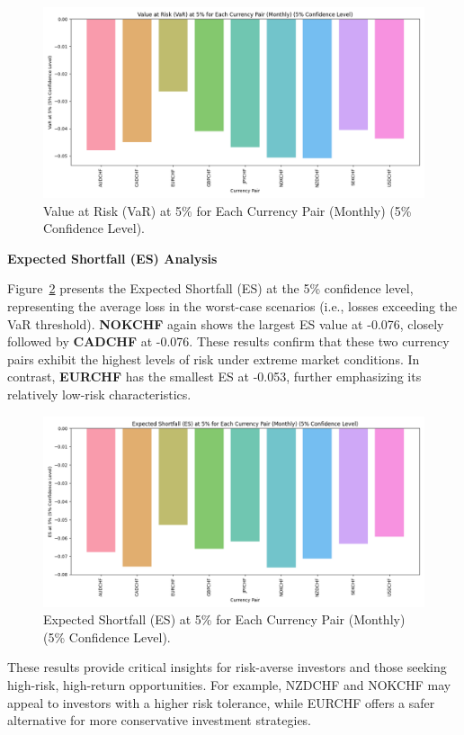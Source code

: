 \documentclass{article}
\begin{document}
\begin{figure}[H]
    \centering
    \includegraphics[width=0.75\linewidth]{reports/figures/VaR_5_percent_plot.png}
    \caption{Value at Risk (VaR) at 5\% for Each Currency Pair (Monthly) (5\% Confidence Level).}
    \label{fig:VaR_plot}
\end{figure}

\textbf{Expected Shortfall (ES) Analysis}

Figure~\ref{fig:ES_plot} presents the Expected Shortfall (ES) at the 5\% confidence level, representing the average loss in the worst-case scenarios (i.e., losses exceeding the VaR threshold). \textbf{NOKCHF} again shows the largest ES value at -0.076, closely followed by \textbf{CADCHF} at -0.076. These results confirm that these two currency pairs exhibit the highest levels of risk under extreme market conditions. In contrast, \textbf{EURCHF} has the smallest ES at -0.053, further emphasizing its relatively low-risk characteristics.

\begin{figure}[H]
    \centering
    \includegraphics[width=0.75\linewidth]{reports/figures/ES_5_percent_plot.png}
    \caption{Expected Shortfall (ES) at 5\% for Each Currency Pair (Monthly) (5\% Confidence Level).}
    \label{fig:ES_plot}
\end{figure}

These results provide critical insights for risk-averse investors and those seeking high-risk, high-return opportunities. For example, NZDCHF and NOKCHF may appeal to investors with a higher risk tolerance, while EURCHF offers a safer alternative for more conservative investment strategies.
\end{document}
